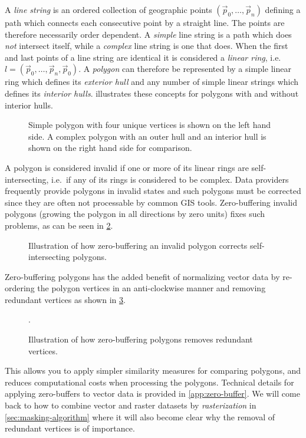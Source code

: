 A \textit{line string} is an ordered collection of geographic points $(\vec{p}_0, \ldots, \vec{p}_n)$ defining a path which connects each consecutive point by a straight line.
The points are therefore necessarily order dependent.
A \textit{simple} line string is a path which does \textit{not} intersect itself, while a \textit{complex} line string is one that does.
When the first and last points of a line string are identical it is considered a \textit{linear ring}, i.e.\ $l = (\vec{p}_0, \ldots, \vec{p}_n, \vec{p}_0)$.
A \textit{polygon} can therefore be represented by a simple linear ring which defines its \textit{exterior hull} and any number of simple linear strings which defines its \textit{interior hulls}.
 illustrates these concepts for polygons with and without interior hulls. %

\begin{figure}[H]
  \centering
  
  \textcolor{gray}{\vrule}
  \hspace{0.01\linewidth}
  
  \caption{%
    Simple polygon with four unique vertices is shown on the left hand side.
    A complex polygon with an outer hull
    and an interior hull is shown on the right hand side for comparison.
  }%
  \label{fig:polygon-representation}
\end{figure}

A polygon is considered invalid if one or more of its linear rings are self-intersecting, i.e.\ if any of its rings is considered to be complex.
Data providers frequently provide polygons in invalid states and such polygons must be corrected since they are often not processable by common GIS tools.
Zero-buffering invalid polygons (growing the polygon in all directions by zero units) fixes such problems, as can be seen in \cref{fig:complex-zero-buffer}.

\begin{figure}[H]
  \centering
  
  \caption{Illustration of how zero-buffering an invalid polygon corrects self-intersecting polygons.}%
  \label{fig:complex-zero-buffer}
\end{figure}

Zero-buffering polygons has the added benefit of normalizing vector data by re-ordering the polygon vertices in an anti-clockwise manner and removing redundant vertices as shown in \cref{fig:redundant-zero-buffer}.

\begin{figure}[H]
  \centering
  
  \caption{Illustration of how zero-buffering polygons removes redundant vertices.}%
  \label{fig:redundant-zero-buffer}.
\end{figure}

This allows you to apply simpler similarity measures for comparing polygons, and reduces computational costs when processing the polygons.
Technical details for applying zero-buffers to vector data is provided in \cref{app:zero-buffer}.
We will come back to how to combine vector and raster datasets by \textit{rasterization} in \cref{sec:masking-algorithm} where it will also become clear why the removal of redundant vertices is of importance.
